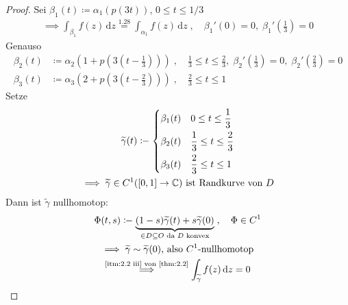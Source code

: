 \documentclass[a4paper,10pt]{scrbook}
\begin{document}
\begin{theorem}[Hilfssatz]
\begin{proof}
    Sei $\beta_1(t) \coloneq \alpha_1(p(3t))$, $0 \leq t \leq 1/3$
    \begin{align*}
      \implies \int_{\beta_1} f(z) \, \mathrm{d}z \overset{\text{1.28}}{=} \int_{\alpha_1} f(z) \, \mathrm{d}z \; , \quad \beta_1'(0) = 0 , \; \beta_1'\left(\frac{1}{3}\right) = 0
    \end{align*}
    Genauso
    \begin{align*}
      \beta_2(t) &\coloneq \alpha_2\left( 1 + p \left( 3 \left( t - \frac{1}{3} \right) \right) \right) \; , \quad \frac{1}{3} \leq t \leq \frac{2}{3} , \; \beta_2'\left(\frac{1}{3}\right) = 0 , \; \beta_2'\left(\frac{2}{3}\right) = 0 \\
      \beta_3(t) &\coloneq \alpha_3\left( 2 + p \left( 3 \left( t - \frac{2}{3} \right) \right) \right) \; , \quad \frac{2}{3} \leq t \leq 1
    \end{align*}
    Setze
    \begin{gather*}
      \widetilde{\gamma}(t) \coloneq
      \begin{dcases}
        \beta_1(t) & 0 \leq t \leq \frac{1}{3} \\
        \beta_2(t) & \frac{1}{3} \leq t \leq \frac{2}{3} \\
        \beta_3(t) & \frac{2}{3} \leq t \leq 1
      \end{dcases} \\
      \implies \widetilde{\gamma} \in C^1([0,1] \to \mathbb{C}) \text{ ist Randkurve von $D$}
    \end{gather*}
    Dann ist $\widetilde{\gamma}$ nullhomotop:
    \begin{gather*}
      \Phi(t,s) \coloneq \underbrace{(1-s) \widetilde{\gamma}(t) + s \widetilde{\gamma}(0)}_{\in D \subseteq O \text{ da $D$ konvex}} \; , \quad \Phi \in C^1 \\
      \implies \widetilde{\gamma} \sim \widetilde{\gamma}(0) \text{, also $C^1$-nullhomotop} \\
      \overset{\text{\ref{itm:2.2 iii} von \ref{thm:2.2}}}{\implies} \int_{\widetilde{\gamma}} f(z) \, \mathrm{d}z = 0
    \end{gather*}
  \end{proof}
\end{theorem}
\end{document}
